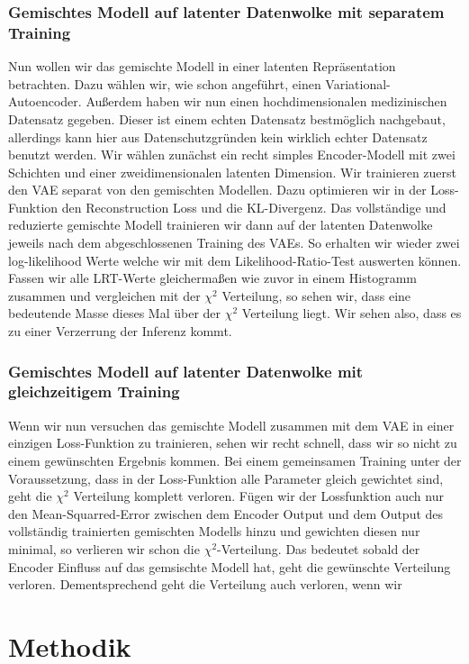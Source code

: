 \documentclass[%
thesis=student,%
coverpage=false,%
titlepage=false,%
headmarks=true, %
german,%
font=libertine, %
math=newpxtx, %
BCOR=5mm,%
coverBCOR=11mm%
]{tumbook}
\theoremstyle{break}
\begin{document}
\subsection{Gemischtes Modell auf latenter Datenwolke mit separatem Training}
Nun wollen wir das gemischte Modell in einer latenten Repräsentation betrachten. Dazu wählen wir, wie schon angeführt, einen Variational-Autoencoder. Außerdem haben wir nun einen hochdimensionalen medizinischen Datensatz gegeben. Dieser ist einem echten Datensatz bestmöglich nachgebaut, allerdings kann hier aus Datenschutzgründen kein wirklich echter Datensatz benutzt werden. Wir wählen zunächst ein recht simples Encoder-Modell mit zwei Schichten und einer zweidimensionalen latenten Dimension. 
Wir trainieren zuerst den VAE separat von den gemischten Modellen. Dazu optimieren wir in der Loss-Funktion den Reconstruction Loss und die KL-Divergenz. Das vollständige und reduzierte gemischte Modell trainieren wir dann auf der latenten Datenwolke jeweils nach dem abgeschlossenen Training des VAEs. So erhalten wir wieder zwei log-likelihood Werte welche wir mit dem Likelihood-Ratio-Test auswerten können. Fassen wir alle LRT-Werte gleichermaßen wie zuvor in einem Histogramm zusammen und vergleichen mit der $\chi^2$ Verteilung, so sehen wir, dass eine bedeutende Masse dieses Mal über der $\chi^2$ Verteilung liegt. Wir sehen also, dass es zu einer Verzerrung der Inferenz kommt. 
\subsection{Gemischtes Modell auf latenter Datenwolke mit gleichzeitigem Training}
Wenn wir nun versuchen das gemischte Modell zusammen mit dem VAE in einer einzigen Loss-Funktion zu trainieren, sehen wir recht schnell, dass wir so nicht zu einem gewünschten Ergebnis kommen. Bei einem gemeinsamen Training unter der Voraussetzung, dass in der Loss-Funktion alle Parameter gleich gewichtet sind, geht die $\chi^2$ Verteilung komplett verloren. 
Fügen wir der Lossfunktion auch nur den Mean-Squarred-Error zwischen dem Encoder Output und dem Output des vollständig trainierten gemischten Modells hinzu und gewichten diesen nur minimal, so verlieren wir schon die $\chi^2$-Verteilung. Das bedeutet sobald der Encoder Einfluss auf das gemsischte Modell hat, geht die gewünschte Verteilung verloren.
Dementsprechend geht die Verteilung auch verloren, wenn wir 

\chapter{Methodik}
\end{document}
